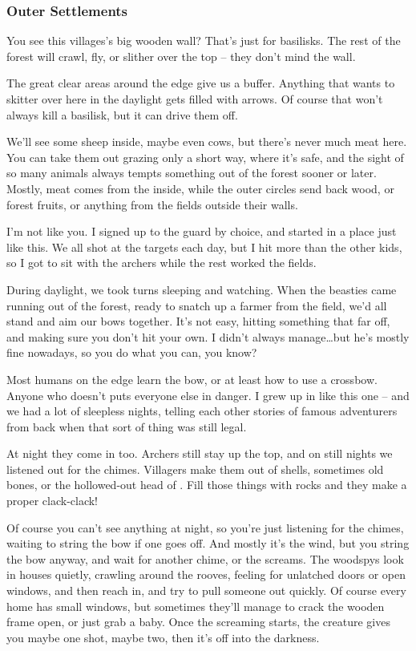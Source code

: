 \begin{multicols}{2}
\begin{exampletext}
  \subsubsection*{Outer Settlements}

  You see this \glspl{village}'s big wooden wall?
  That's just for \glspl{basilisk}.
  The rest of the forest will crawl, fly, or slither over the top -- they don't mind the wall.

  The great clear areas around the \gls{edge} give us a buffer.
  Anything that wants to skitter over here in the daylight gets filled with arrows.
  Of course that won't always kill a \gls{basilisk}, but it can drive them off.

  We'll see some sheep inside, maybe even cows, but there's never much meat here.
  You can take them out grazing only a short way, where it's safe, and the sight of so many animals always tempts something out of the forest sooner or later.
  Mostly, meat comes from the inside, while the outer circles send back wood, or forest fruits, or anything from the fields outside their walls.

  I'm not like you.
  I signed up to the \gls{guard} by choice, and started in a place just like this.
  We all shot at the targets each day, but I hit more than the other kids, so I got to sit with the archers while the rest worked the fields.

  During daylight, we took turns sleeping and watching.
  When the beasties came running out of the forest, ready to snatch up a farmer from the field, we'd all stand and aim our bows together.
  It's not easy, hitting something that far off, and making sure you don't hit your own.
  I didn't always manage\ldots but he's mostly fine nowadays, so you do what you can, you know?

  Most humans on the \gls{edge} learn the bow, or at least how to use a crossbow.
  Anyone who doesn't puts everyone else in danger.
  I grew up in  like this one -- and we had a lot of sleepless nights, telling each other stories of famous adventurers from back when that sort of thing was still legal.

  At night they come in too.
  Archers still stay up the top, and on still nights we listened out for the chimes.
  Villagers make them out of shells, sometimes old bones, or the hollowed-out head of .
  Fill those things with rocks and they make a proper clack-clack!

  Of course you can't see anything at night, so you're just listening for the chimes, waiting to string the bow if one goes off.
  And mostly it's the wind, but you string the bow anyway, and wait for another chime, or the screams.
  The \glspl{woodspy} look in houses quietly, crawling around the rooves, feeling for unlatched doors or open windows, and then reach in, and try to pull someone out quickly.
  Of course every home has small windows, but sometimes they'll manage to crack the wooden frame open, or just grab a baby.
  Once the screaming starts, the creature gives you maybe one shot, maybe two, then it's off into the darkness.


\end{exampletext}
\end{multicols}
